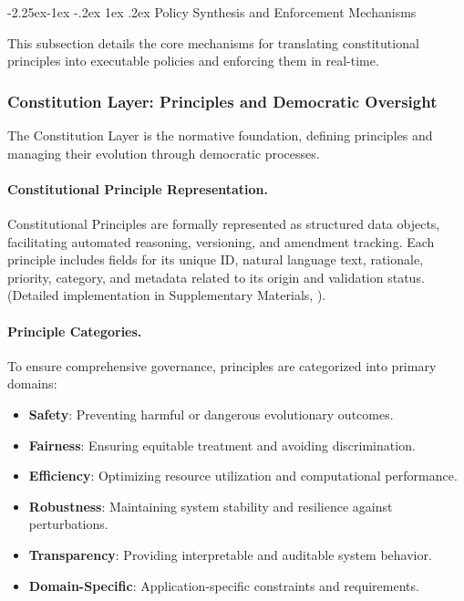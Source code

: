 \documentclass[manuscript,screen,review,anonymous,9pt]{acmart}
\makeatletter
\renewcommand\subsection{\@startsection{subsection}{2}{\z@}%
  {-2.25ex\@plus -1ex \@minus -.2ex}%
  {1ex \@plus .2ex}%
  {\normalfont\large\bfseries}}
\makeatother
\begin{document}
\subsection{Policy Synthesis and Enforcement Mechanisms}
\label{subsec:policy_synthesis_enforcement}

This subsection details the core mechanisms for translating constitutional principles into executable policies and enforcing them in real-time.

\subsubsection{Constitution Layer: Principles and Democratic Oversight}
\label{subsubsec:constitution_layer}
The Constitution Layer is the normative foundation, defining principles and managing their evolution through democratic processes.

\paragraph{Constitutional Principle Representation.} Constitutional Principles are formally represented as structured data objects, facilitating automated reasoning, versioning, and amendment tracking. Each principle includes fields for its unique ID, natural language text, rationale, priority, category, and metadata related to its origin and validation status. (Detailed implementation in Supplementary Materials, ).

\paragraph{Principle Categories.} To ensure comprehensive governance, principles are categorized into primary domains:
\begin{itemize}[leftmargin=*,itemsep=1pt,parsep=1pt]
    \item \textbf{Safety}: Preventing harmful or dangerous evolutionary outcomes.
    \item \textbf{Fairness}: Ensuring equitable treatment and avoiding discrimination.
    \item \textbf{Efficiency}: Optimizing resource utilization and computational performance.
    \item \textbf{Robustness}: Maintaining system stability and resilience against perturbations.
    \item \textbf{Transparency}: Providing interpretable and auditable system behavior.
    \item \textbf{Domain-Specific}: Application-specific constraints and requirements.
\end{itemize}
\end{document}

